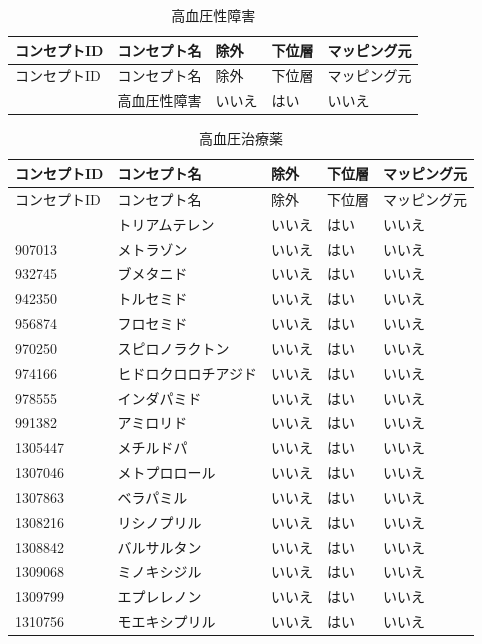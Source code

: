 \documentclass[
  11pt]{book}
\theoremstyle{definition}
\theoremstyle{definition}
\theoremstyle{definition}
\theoremstyle{definition}
\theoremstyle{remark}
\begin{document}
\begin{longtable}[]{@{}lllll@{}}
\caption{\label{tab:hypertensionAceMono} 高血圧性障害}\tabularnewline
\toprule\noalign{}
コンセプトID & コンセプト名 & 除外 & 下位層 & マッピング元 \\
\midrule\noalign{}
\endfirsthead
\toprule\noalign{}
コンセプトID & コンセプト名 & 除外 & 下位層 & マッピング元 \\
\midrule\noalign{}
\endhead
\bottomrule\noalign{}
\endlastfoot
316866 & 高血圧性障害 & いいえ & はい & いいえ \\
\end{longtable}

\begin{longtable}[]{@{}lllll@{}}
\caption{\label{tab:htnDrugsAceMono} 高血圧治療薬}\tabularnewline
\toprule\noalign{}
コンセプトID & コンセプト名 & 除外 & 下位層 & マッピング元 \\
\midrule\noalign{}
\endfirsthead
\toprule\noalign{}
コンセプトID & コンセプト名 & 除外 & 下位層 & マッピング元 \\
\midrule\noalign{}
\endhead
\bottomrule\noalign{}
\endlastfoot
904542 & トリアムテレン & いいえ & はい & いいえ \\
907013 & メトラゾン & いいえ & はい & いいえ \\
932745 & ブメタニド & いいえ & はい & いいえ \\
942350 & トルセミド & いいえ & はい & いいえ \\
956874 & フロセミド & いいえ & はい & いいえ \\
970250 & スピロノラクトン & いいえ & はい & いいえ \\
974166 & ヒドロクロロチアジド & いいえ & はい & いいえ \\
978555 & インダパミド & いいえ & はい & いいえ \\
991382 & アミロリド & いいえ & はい & いいえ \\
1305447 & メチルドパ & いいえ & はい & いいえ \\
1307046 & メトプロロール & いいえ & はい & いいえ \\
1307863 & ベラパミル & いいえ & はい & いいえ \\
1308216 & リシノプリル & いいえ & はい & いいえ \\
1308842 & バルサルタン & いいえ & はい & いいえ \\
1309068 & ミノキシジル & いいえ & はい & いいえ \\
1309799 & エプレレノン & いいえ & はい & いいえ \\
1310756 & モエキシプリル & いいえ & はい & いいえ \\

\end{longtable}
\end{document}
